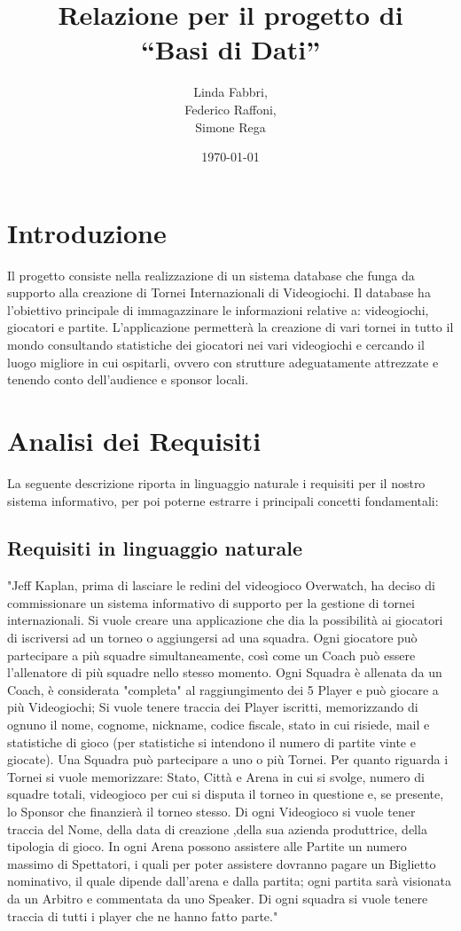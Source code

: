 \documentclass[a4paper,12pt]{report}
\title{Relazione per il progetto di\\``Basi di Dati''}
\author{Linda Fabbri,\\Federico Raffoni,\\Simone Rega}
\date{\today}
\begin{document}
\maketitle

\tableofcontents

\chapter{Introduzione}

Il progetto consiste nella realizzazione di un sistema database che funga da supporto alla creazione di Tornei Internazionali di Videogiochi.
Il database ha l'obiettivo principale di immagazzinare le informazioni relative a: videogiochi, giocatori e partite. 
L'applicazione permetterà la creazione di vari tornei in tutto il mondo consultando statistiche dei giocatori nei vari videogiochi e cercando il luogo migliore in cui ospitarli, ovvero con strutture adeguatamente attrezzate e tenendo conto dell'audience e sponsor locali.


\chapter{Analisi dei Requisiti}
La seguente descrizione riporta in linguaggio naturale i requisiti per il nostro sistema informativo, per poi poterne estrarre i principali concetti fondamentali:
\section{Requisiti in linguaggio naturale}
"Jeff Kaplan, prima di lasciare le redini del videogioco Overwatch, ha deciso di commissionare un sistema informativo di supporto per la gestione di tornei internazionali.
Si vuole creare una applicazione che dia la possibilità ai giocatori di iscriversi ad un torneo o aggiungersi ad una squadra.
Ogni giocatore può partecipare a più squadre simultaneamente, così come un Coach può essere l'allenatore  di più squadre nello stesso momento.
Ogni Squadra è allenata da un Coach, è considerata "completa" al raggiungimento dei 5 Player e può giocare a più Videogiochi;
Si vuole tenere traccia dei Player iscritti, memorizzando di ognuno il nome, cognome, nickname, codice fiscale, stato in cui risiede, mail e statistiche di gioco (per statistiche si intendono il numero di partite vinte e giocate).
Una Squadra può partecipare a uno o più Tornei.
Per quanto riguarda i Tornei si vuole memorizzare: Stato, Città e Arena in cui si svolge, numero di squadre totali, videogioco per cui si disputa il torneo in questione e, se presente, lo Sponsor che finanzierà il torneo stesso.
Di ogni Videogioco si vuole tener traccia del Nome, della data di creazione ,della sua azienda produttrice, della tipologia di gioco.
In ogni Arena possono assistere alle Partite un numero massimo di Spettatori, i quali per poter assistere dovranno pagare un Biglietto nominativo, il quale dipende dall'arena e dalla partita; ogni partita sarà visionata da un Arbitro e commentata da uno Speaker.
Di ogni squadra si vuole tenere traccia di tutti i player che ne hanno fatto parte."
\end{document}
